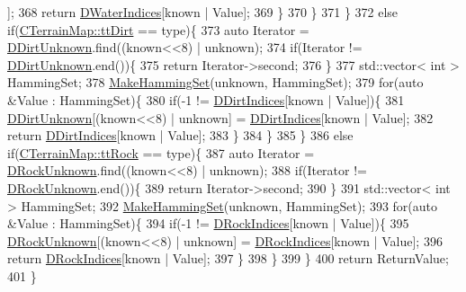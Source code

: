 \begin{DoxyCode}
      ];
368                 \textcolor{keywordflow}{return} \hyperlink{classCMapRenderer_af82295ac61f841481490da6f2b433db2}{DWaterIndices}[known | Value];
369             \}
370         \}
371     \}
372     \textcolor{keywordflow}{else} \textcolor{keywordflow}{if}(\hyperlink{classCTerrainMap_aff2ab991e237269941416dd79d8871d4a49fb754039632e7127fca005dd95bab8}{CTerrainMap::ttDirt} == type)\{
373         \textcolor{keyword}{auto} Iterator = \hyperlink{classCMapRenderer_ab899664d372da1c8e4b5802c9e720173}{DDirtUnknown}.find((known<<8) | unknown);
374         \textcolor{keywordflow}{if}(Iterator != \hyperlink{classCMapRenderer_ab899664d372da1c8e4b5802c9e720173}{DDirtUnknown}.end())\{
375             \textcolor{keywordflow}{return} Iterator->second;
376         \}
377         std::vector< int > HammingSet;
378         \hyperlink{classCMapRenderer_a0b06ba89b9a7ad75fa945a3c22dc019a}{MakeHammingSet}(unknown, HammingSet);
379         \textcolor{keywordflow}{for}(\textcolor{keyword}{auto} &Value : HammingSet)\{
380             \textcolor{keywordflow}{if}(-1 != \hyperlink{classCMapRenderer_a5916c26aa5bedf8367a8f3f7efb457bf}{DDirtIndices}[known | Value])\{
381                 \hyperlink{classCMapRenderer_ab899664d372da1c8e4b5802c9e720173}{DDirtUnknown}[(known<<8) | unknown] = \hyperlink{classCMapRenderer_a5916c26aa5bedf8367a8f3f7efb457bf}{DDirtIndices}[known | Value];
382                 \textcolor{keywordflow}{return} \hyperlink{classCMapRenderer_a5916c26aa5bedf8367a8f3f7efb457bf}{DDirtIndices}[known | Value];
383             \}
384         \}
385     \}
386     \textcolor{keywordflow}{else} \textcolor{keywordflow}{if}(\hyperlink{classCTerrainMap_aff2ab991e237269941416dd79d8871d4a215740f194a2d72a21d47c848fbfecad}{CTerrainMap::ttRock} == type)\{
387         \textcolor{keyword}{auto} Iterator = \hyperlink{classCMapRenderer_a28aa9c33d5d2eeae0ef7c23e59712274}{DRockUnknown}.find((known<<8) | unknown);
388         \textcolor{keywordflow}{if}(Iterator != \hyperlink{classCMapRenderer_a28aa9c33d5d2eeae0ef7c23e59712274}{DRockUnknown}.end())\{
389             \textcolor{keywordflow}{return} Iterator->second;
390         \}
391         std::vector< int > HammingSet;
392         \hyperlink{classCMapRenderer_a0b06ba89b9a7ad75fa945a3c22dc019a}{MakeHammingSet}(unknown, HammingSet);
393         \textcolor{keywordflow}{for}(\textcolor{keyword}{auto} &Value : HammingSet)\{
394             \textcolor{keywordflow}{if}(-1 != \hyperlink{classCMapRenderer_ac9178a9c9d30ac44aed7d324c51164a4}{DRockIndices}[known | Value])\{
395                 \hyperlink{classCMapRenderer_a28aa9c33d5d2eeae0ef7c23e59712274}{DRockUnknown}[(known<<8) | unknown] = \hyperlink{classCMapRenderer_ac9178a9c9d30ac44aed7d324c51164a4}{DRockIndices}[known | Value];
396                 \textcolor{keywordflow}{return} \hyperlink{classCMapRenderer_ac9178a9c9d30ac44aed7d324c51164a4}{DRockIndices}[known | Value];
397             \}
398         \}
399     \}
400     \textcolor{keywordflow}{return} ReturnValue;
401 \}
\end{DoxyCode}
